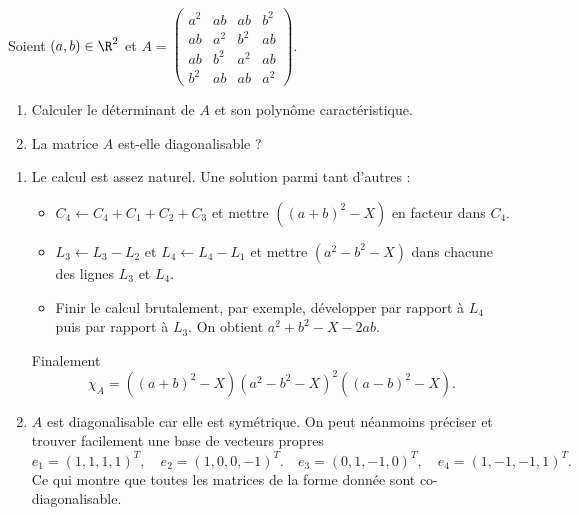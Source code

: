 \begin{enonce}
\begin{exercise}[ID={RMS121/2 E547, Mines-Ponts PSI},subtitle={},tags={}]
Soient $(a,b)\in\R^2$ et 
$A=\begin{pmatrix}
a^2& ab  & ab  & b^2\\
ab & a^2 & b^2 & ab\\
ab & b^2 & a^2 & ab\\
b^2& ab  & ab  & a^2
\end{pmatrix}$.
\begin{enumerate}
\item Calculer le déterminant de $A$ et son polynôme caractéristique.
\item La matrice $A$ est-elle diagonalisable ?
\end{enumerate}
\end{exercise}
\begin{solution}
\begin{enumerate}
\item Le calcul est assez naturel. Une solution parmi tant d'autres :
    \begin{itemize}
        \item $C_4\gets C_4+C_1+C_2+C_3$ et mettre $((a+b)^2-X)$ en facteur dans $C_4$.
        \item $L_3\gets L_3-L_2$ et $L_4\gets L_4-L_1$ et mettre $(a^2-b^2-X)$ dans chacune des lignes $L_3$ et $L_4$.
        \item Finir le calcul brutalement, par exemple, développer par rapport à $L_4$ puis par rapport à $L_3$. On obtient $a^2+b^2-X-2ab$.
    \end{itemize}    
Finalement
\begin{equation*}
    \boxed{ \chi_A= \left( (a+b)^2-X \right) \left( a^2-b^2-X \right)^2 \left( (a-b)^2-X \right).}
\end{equation*}
\item $A$ est diagonalisable car elle est symétrique.
On peut néanmoins préciser et trouver facilement une base de vecteurs propres
\begin{equation*}
e_1=(1,1,1,1)^T,\quad
e_2=(1,0,0,-1)^T.\quad
e_3=(0,1,-1,0)^T,\quad
e_4=(1,-1,-1,1)^T.
\end{equation*}
Ce qui montre que toutes les matrices de la forme donnée sont co-diagonalisable.
\end{enumerate}
\end{solution}
\end{enonce}
